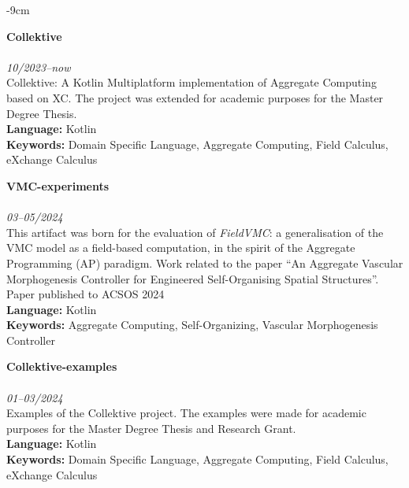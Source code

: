 \documentclass[10pt,a4paper]{altacv}
\begin{document}
\begin{adjustwidth}{}{-9cm}

    \textbf{Collektive}\\
    \\
    \textit{10/2023--now}\\ \smallskip
    Collektive: A Kotlin Multiplatform implementation of Aggregate Computing based on XC. The project was extended for academic purposes for the Master Degree Thesis.\\ \smallskip
    \smallskip
    \textbf{Language:} Kotlin\\
    \textbf{Keywords:} Domain Specific Language, Aggregate Computing, Field Calculus, eXchange Calculus

    \divider

    \textbf{VMC-experiments}\\
    \\
    \textit{03--05/2024}\\ \smallskip
    This artifact was born for the evaluation of \emph{FieldVMC}: a generalisation of the VMC model as a field-based computation, 
    in the spirit of the Aggregate Programming (AP) paradigm.
    Work related to the paper ``An Aggregate Vascular Morphogenesis Controller for Engineered Self-Organising Spatial Structures''.\\ \smallskip
    {\small \notesymbol \hspace{0.5em} Paper published to ACSOS 2024}\\
    \smallskip
    \textbf{Language:} Kotlin\\
    \textbf{Keywords:} Aggregate Computing, Self-Organizing, Vascular Morphogenesis Controller

    \divider

    \textbf{Collektive-examples}\\
    \\
    \textit{01--03/2024}\\ \smallskip
    Examples of the Collektive project. The examples were made for academic purposes for the Master Degree Thesis and Research Grant.\\ \smallskip
    \smallskip
    \textbf{Language:} Kotlin\\
    \textbf{Keywords:} Domain Specific Language, Aggregate Computing, Field Calculus, eXchange Calculus


\end{adjustwidth}
\end{document}
